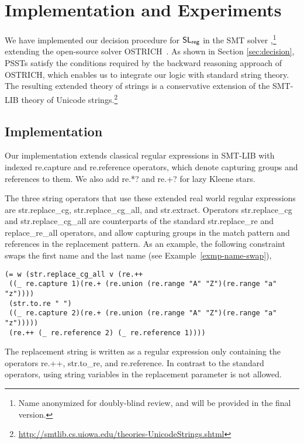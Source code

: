 
\section{Implementation and Experiments}
\label{sect:impl}

We have implemented our decision procedure for $\mathsf{SL}_{\sf reg}$ in the SMT
solver \ostrich,\footnote{Name anonymized for doubly-blind review,
and will be provided in the final version.} extending the
open-source solver OSTRICH~\cite{CHL+19}.
As shown in Section \ref{sec:decision},
PSSTs satisfy the conditions required by the backward reasoning
approach of OSTRICH, which enables us to integrate our logic with
standard string theory. The resulting extended theory of strings is a
conservative extension of the SMT-LIB theory of Unicode
strings.\footnote{\url{http://smtlib.cs.uiowa.edu/theories-UnicodeStrings.shtml}}

\subsection{Implementation}

Our implementation extends classical regular expressions in SMT-LIB
with indexed {\sf re.capture} and {\sf re.reference} operators, which
denote capturing groups and references to them. We also add {\sf re.*?}
and {\sf re.+?} for lazy Kleene stars.

The three string operators that use these extended real world regular
expressions are {\sf str.replace\_cg}, {\sf str.replace\_cg\_all}, and
{\sf str.extract}. Operators {\sf str.replace\_cg} and {\sf
  str.replace\_cg\_all} are counterparts of the standard {\sf
  str.replace\_re} and {\sf replace\_re\_all} operators, and allow
capturing groups in the match pattern and references in the
replacement pattern. As an example, the following constraint swaps the first name and the last name (see Example~\ref{exmp-name-swap}),
%
{\small
\begin{verbatim}
(= w (str.replace_cg_all v (re.++  
 ((_ re.capture 1)(re.+ (re.union (re.range "A" "Z")(re.range "a" "z"))))
 (str.to.re " ") 
 ((_ re.capture 2)(re.+ (re.union (re.range "A" "Z")(re.range "a" "z")))))
 (re.++ (_ re.reference 2) (_ re.reference 1))))
\end{verbatim}
}
%
The replacement string is written as a regular expression only
containing the operators {\sf re.++}, {\sf str.to\_re}, and {\sf re.reference}. In contrast to the standard operators, using string variables in the 
replacement parameter is not allowed.

